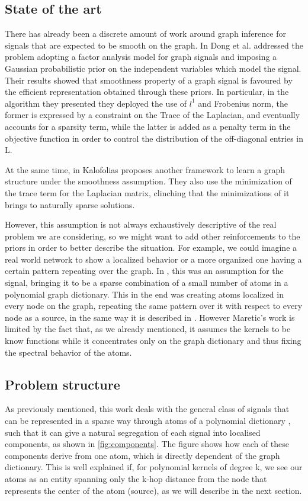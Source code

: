 \subsection{State of the art}
There has already been a discrete amount of work around graph inference for signals that are expected to be smooth on the graph.  In \cite{Dong2016} Dong et al. addressed the problem adopting a factor analysis model for graph signals and imposing a Gaussian probabilistic prior on the independent variables which model the signal. Their results showed that smoothness property of a graph signal is favoured by the efficient representation obtained through these priors. In particular, in the algorithm they presented they deployed the use of $l^1$ and Frobenius norm, the former is expressed by a constraint on the Trace of the Laplacian, and eventually accounts for a sparsity term, while the latter is added as a penalty term in the objective function in order to control the distribution of the off-diagonal entries in L.

At the same time, in \cite{Kalofolias2016} Kalofolias proposes another framework to learn a graph structure under the smoothness assumption. They also use the minimization of the trace term for the Laplacian matrix, clinching that the minimizations of it brings to naturally sparse solutions.

However, this assumption is not always exhaustively descriptive of the real problem we are considering, so we might want to add other reinforcements to the priors in order to better describe the situation. For example, we could imagine a real world network to show a localized behavior or a more organized one having a certain pattern repeating over the graph. In \cite{Maretic2017}, this was an assumption for the signal, bringing it to be a sparse combination of a small number of atoms in a polynomial graph dictionary. This in the end was creating atoms localized in every node on the graph, repeating the same pattern over it with respect to every node as a source, in the same way it is described in \cite{Thanou2014}. However Maretic's work is limited by the fact that, as we already mentioned, it assumes the kernels to be know functions while it concentrates only on the graph dictionary and thus fixing the spectral behavior of the atoms.

\subsection{Problem structure}
As previously mentioned, this work deals with the general class of signals that can be represented in a sparse way through atoms of a polynomial dictionary \cite{Thanou2014}, such that it can give a natural segregation of each signal into localised components, as shown in \autoref{fig:components}. The figure shows how each of these components derive from one atom, which is directly dependent of the graph dictionary. This is well explained if, for polynomial kernels of degree k, we see our atoms as an entity spanning only the k-hop distance from the node that represents the center of the atom (source), as we will describe in the next section.

